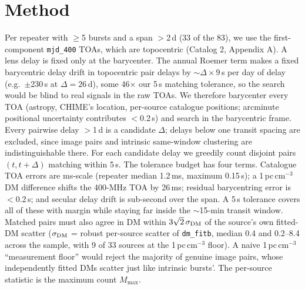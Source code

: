 \documentclass[twocolumn]{aastex631}
\newcommand{\code}[1]{\texttt{#1}}
\begin{document}
\section{Method}
\label{sec:method}
Per repeater with $\ge$5 bursts and a span $>$2\,d (33 of the 83), we use the first-component
\code{mjd\_400} TOAs, which are topocentric (Catalog 2, Appendix A). A lens delay is fixed
only at the barycenter. The annual Roemer term makes a fixed barycentric delay drift in
topocentric pair delays by $\sim$$\Delta\times9$\,s per day of delay (e.g.\ $\pm$230\,s at
$\Delta=26$\,d), some 46$\times$ our 5\,s matching tolerance, so the search would be blind to
real signals in the raw TOAs. We therefore barycenter every TOA (astropy, CHIME's location,
per-source catalogue positions; arcminute positional uncertainty contributes $<$0.2\,s) and
search in the barycentric frame. Every pairwise delay $>$1\,d is a candidate $\Delta$; delays
below one transit spacing are excluded, since image pairs and intrinsic same-window
clustering are indistinguishable there. For each candidate delay we greedily count disjoint
pairs $(t, t+\Delta)$ matching within 5\,s. The tolerance budget has four terms. Catalogue TOA
errors are ms-scale (repeater median 1.2\,ms, maximum 0.15\,s); a
1\,pc\,cm$^{-3}$ DM difference shifts the 400-MHz TOA by 26\,ms; residual barycentring error
is $<$0.2\,s; and secular delay drift \citep{dailu2017} is sub-second over the span. A 5\,s
tolerance covers all of these with margin while staying far inside the $\sim$15-min transit
window. Matched pairs must also agree in DM within $3\sqrt{2}\,\sigma_{\rm DM}$ of the
source's own fitted-DM scatter ($\sigma_{\rm DM}$ = robust per-source scatter of
\code{dm\_fitb}, median 0.4 and 0.2--8.4 across the sample, with 9 of 33 sources at the
1\,pc\,cm$^{-3}$ floor). A naive 1\,pc\,cm$^{-3}$ ``measurement floor'' would reject the
majority of genuine image pairs, whose independently fitted DMs scatter just like intrinsic
bursts'. The per-source statistic is the maximum count $M_{\max}$.
\end{document}

